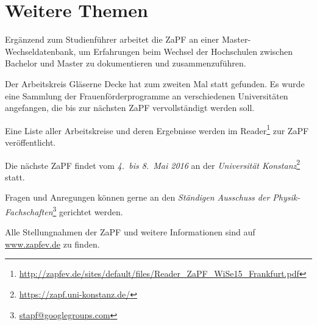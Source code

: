 \section*{Weitere Themen}
Ergänzend zum Studienführer arbeitet die ZaPF an einer Master-Wechseldatenbank,
um Erfahrungen beim Wechsel der Hochschulen zwischen Bachelor und Master zu
dokumentieren und zusammenzuführen.

Der Arbeitskreis \glqq{}Gläserne Decke\grqq{} hat zum zweiten Mal statt
gefunden. Es wurde eine Sammlung der Frauenförderprogramme an verschiedenen
Universitäten angefangen, die bis zur nächsten ZaPF vervollständigt werden
soll.

Eine Liste aller Arbeitskreise und deren Ergebnisse werden im
Reader\footnote{\href{http://zapfev.de/sites/default/files/Reader\_ZaPF\_WiSe15\_Frankfurt.pdf}{\url{http://zapfev.de/sites/default/files/Reader\_ZaPF\_WiSe15\_Frankfurt.pdf}}}
zur ZaPF veröffentlicht.

\vfill

Die nächste ZaPF findet vom \emph{4.\ bis 8.\ Mai 2016} an der  \emph{Universität Konstanz}\footnote{\href{https://zapf.uni-konstanz.de/}{\url{https://zapf.uni-konstanz.de/}}} statt.

Fragen und Anregungen können gerne an den \emph{Ständigen Ausschuss der Physik-Fachschaften}\footnote{\href{mailto:stapf@googlegroups.com}{\url{stapf@googlegroups.com}}} gerichtet werden.

Alle Stellungnahmen der ZaPF und weitere Informationen sind auf \href{http://www.zapfev.de}{\url{www.zapfev.de}} zu finden.

